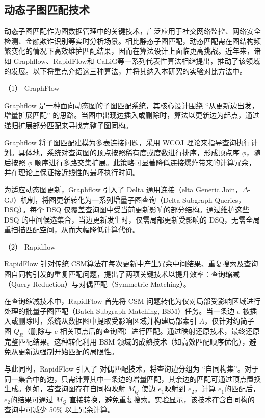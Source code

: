 \subsection{动态子图匹配技术}
动态子图匹配作为图数据管理中的关键技术，广泛应用于社交网络监控、网络安全检测、金融欺诈识别等实时分析场景。相比静态子图匹配，动态匹配需在图结构频繁变化的情况下高效维护匹配结果，因而在算法设计上面临更高挑战。近年来，诸如 Graphflow\cite{csm-graphflow-DBLP:conf/sigmod/KankanamgeSMCS17}、RapidFlow\cite{csm-rapidflow-DBLP:journals/pvldb/SunSHL22}和 CaLiG\cite{csm-calig-DBLP:journals/pacmmod/YangZZY23}等一系列代表性算法相继提出，推动了该领域的发展。以下将重点介绍这三种算法，并将其纳入本研究的实验对比方法中。

（1） GraphFlow

Graphflow\cite{csm-graphflow-DBLP:conf/sigmod/KankanamgeSMCS17} 是一种面向动态图的子图匹配系统，其核心设计围绕 “从更新边出发，增量扩展匹配” 的思路。当图中出现边插入或删除时，算法以更新边为起点，通过递归扩展部分匹配来寻找完整子图同构。

Graphflow 将子图匹配建模为多表连接问题，采用 WCOJ 理论来指导查询执行计划。具体地，系统对查询图的顶点按照稀有度或度数进行排序，形成顶点序 $\phi$，随后按照 $\phi$ 顺序进行多路交集扩展。此策略可显著降低连接爆炸带来的计算冗余，并在理论上保证接近线性的最坏执行时间。

为适应动态图更新，Graphflow 引入了 Delta 通用连接（elta Generic Join，$\Delta$-GJ）机制，将图更新转化为一系列增量子图查询（Delta Subgraph Queries，DSQ）。每个 DSQ 仅覆盖查询图中受当前更新影响的部分结构。通过维护这些 DSQ 的中间候选集合，当边更新发生时，仅需局部更新受影响的 DSQ，无需全局重扫描匹配空间，从而大幅降低计算代价。

（2） Rapidflow 

RapidFlow 针对传统 CSM算法在每次更新中产生冗余中间结果、重复搜索及查询图自同构引发的重复匹配问题，提出了两项关键技术以提升效率：查询缩减（Query Reduction）与对偶匹配（Symmetric Matching）。

在查询缩减技术中，RapidFlow 首先将 CSM 问题转化为仅对局部受影响区域进行处理的批量子图匹配（Batch Subgraph Matching, BSM）任务。当一条边 $e$ 被插入或删除时，系统从数据图中提取受影响区域并构建局部索引 $A$，仅针对约简子图 $Q_R$（删除与 $e$ 相关顶点后的查询图）进行匹配。通过映射还原技术，最终还原完整匹配结果。这种转化利用 BSM 领域的成熟技术（如高效匹配顺序优化），避免从更新边强制开始匹配的局限性。

与此同时，RapidFlow 引入了 对偶匹配技术，将查询边分组为 “自同构集”。对于同一集合中的边，只需计算其中一条边的增量匹配，其余边的匹配可通过顶点置换生成。例如，若查询图存在自同构映射 $M_Q$ 使边 $e_1$映射到 $e_2$，计算 $e_1$的匹配后，$e_2$的结果可通过 $M_Q$ 直接转换，避免重复搜索。实验显示，该技术在含自同构的查询中可减少 50\% 以上冗余计算。

